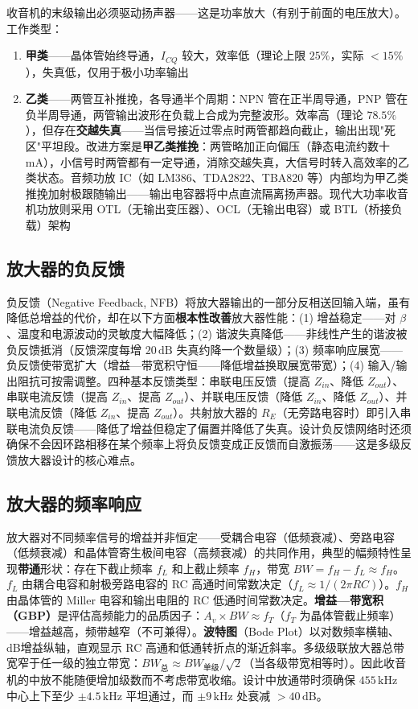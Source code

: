 \documentclass[12pt,UTF8]{ctexbook}
\begin{document}
收音机的末级输出必须驱动扬声器——这是功率放大（有别于前面的电压放大）。工作类型：
\begin{enumerate}
\item \textbf{甲类}——晶体管始终导通，$I_{CQ}$ 较大，效率低（理论上限 $25\%$，实际 $<15\%$），失真低，仅用于极小功率输出
\item \textbf{乙类}——两管互补推挽，各导通半个周期：NPN 管在正半周导通，PNP 管在负半周导通，两管输出波形在负载上合成为完整波形。效率高（理论 $78.5\%$），但存在\textbf{交越失真}——当信号接近过零点时两管都趋向截止，输出出现"死区"平坦段。改进方案是\textbf{甲乙类推挽}：两管略加正向偏压（静态电流约数十 mA），小信号时两管都有一定导通，消除交越失真，大信号时转入高效率的乙类状态。音频功放 IC（如 LM386、TDA2822、TBA820 等）内部均为甲乙类推挽加射极跟随输出——输出电容器将中点直流隔离扬声器。现代大功率收音机功放则采用 OTL（无输出变压器）、OCL（无输出电容）或 BTL（桥接负载）架构
\end{enumerate}

\subsection{放大器的负反馈}

负反馈（Negative Feedback, NFB）将放大器输出的一部分反相送回输入端，虽有降低总增益的代价，却在以下方面\textbf{根本性改善}放大器性能：(1) 增益稳定——对 $\beta$、温度和电源波动的灵敏度大幅降低；(2) 谐波失真降低——非线性产生的谐波被负反馈抵消（反馈深度每增 $20\,\mathrm{dB}$ 失真约降一个数量级）；(3) 频率响应展宽——负反馈使带宽扩大（增益—带宽积守恒——降低增益换取展宽带宽）；(4) 输入/输出阻抗可按需调整。四种基本反馈类型：串联电压反馈（提高 $Z_{in}$、降低 $Z_{out}$）、串联电流反馈（提高 $Z_{in}$、提高 $Z_{out}$）、并联电压反馈（降低 $Z_{in}$、降低 $Z_{out}$）、并联电流反馈（降低 $Z_{in}$、提高 $Z_{out}$）。共射放大器的 $R_E$（无旁路电容时）即引入串联电流负反馈——降低了增益但稳定了偏置并降低了失真。设计负反馈网络时还须确保不会因环路相移在某个频率上将负反馈变成正反馈而自激振荡——这是多级反馈放大器设计的核心难点。

\subsection{放大器的频率响应}

放大器对不同频率信号的增益并非恒定——受耦合电容（低频衰减）、旁路电容（低频衰减）和晶体管寄生极间电容（高频衰减）的共同作用，典型的幅频特性呈现\textbf{带通}形状：存在下截止频率 $f_L$ 和上截止频率 $f_H$，带宽 $BW = f_H - f_L \approx f_H$。$f_L$ 由耦合电容和射极旁路电容的 RC 高通时间常数决定（$f_L \approx 1/(2\pi RC)$）。$f_H$ 由晶体管的 Miller 电容和输出电阻的 RC 低通时间常数决定。\textbf{增益—带宽积（GBP）}是评估高频能力的品质因子：$A_v \times BW \approx f_T$（$f_T$ 为晶体管截止频率）——增益越高，频带越窄（不可兼得）。\textbf{波特图}（Bode Plot）以对数频率横轴、dB增益纵轴，直观显示 RC 高通和低通转折点的渐近斜率。多级级联放大器总带宽窄于任一级的独立带宽：$BW_{\text{总}} \approx BW_{\text{单级}} / \sqrt{2}$（当各级带宽相等时）。因此收音机的中放不能随便增加级数而不考虑带宽收缩。设计中放通带时须确保 $455\,\mathrm{kHz}$ 中心上下至少 $\pm4.5\,\mathrm{kHz}$ 平坦通过，而 $\pm9\,\mathrm{kHz}$ 处衰减 $>40\,\mathrm{dB}$。
\end{document}

